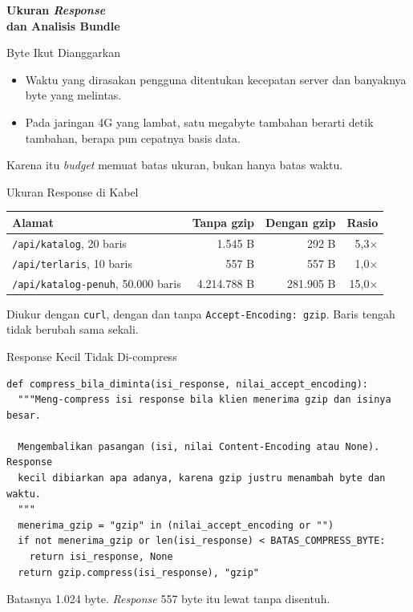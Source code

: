 \documentclass[aspectratio=169, table, 12pt]{beamer}
\begin{document}
\begin{frame}{\hfill}
  \centering
  \Huge{\textbf{Ukuran \textit{Response}\\dan Analisis Bundle}}
\end{frame}

\begin{frame}{{\Large Byte Ikut Dianggarkan}}
  \vspace{14pt}
  \begin{itemize}
    \item Waktu yang dirasakan pengguna ditentukan kecepatan server dan
          banyaknya byte yang melintas.
    \item Pada jaringan 4G yang lambat, satu megabyte tambahan berarti detik
          tambahan, berapa pun cepatnya basis data.
  \end{itemize}
  \vspace{10pt}
  {\footnotesize Karena itu \textit{budget} memuat batas ukuran, bukan hanya batas
  waktu.}
\end{frame}

\begin{frame}{{\Large Ukuran Response di Kabel}}
  \vspace{6pt}
  \centering
  {\footnotesize
  \begin{tabularx}{\textwidth}{Yrrr}
    \hline
    \textbf{Alamat} & \textbf{Tanpa gzip} & \textbf{Dengan gzip} & \textbf{Rasio} \\
    \hline
    \texttt{/api/katalog}, 20 baris & 1.545 B & 292 B & 5,3$\times$ \\
    \hline
    \texttt{/api/terlaris}, 10 baris & 557 B & 557 B & 1,0$\times$ \\
    \hline
    \texttt{/api/katalog-penuh}, 50.000 baris & 4.214.788 B & 281.905 B & 15,0$\times$ \\
    \hline
  \end{tabularx}}

  \vspace{8pt}
  {\footnotesize Diukur dengan \texttt{curl}, dengan dan tanpa
  \texttt{Accept-Encoding: gzip}. Baris tengah tidak berubah sama sekali.}
\end{frame}

\begin{frame}[fragile]{{\Large Response Kecil Tidak Di-compress}}
  \vspace{2pt}
\begin{lstlisting}[style=PythonStyle]
def compress_bila_diminta(isi_response, nilai_accept_encoding):
  """Meng-compress isi response bila klien menerima gzip dan isinya besar.

  Mengembalikan pasangan (isi, nilai Content-Encoding atau None). Response
  kecil dibiarkan apa adanya, karena gzip justru menambah byte dan waktu.
  """
  menerima_gzip = "gzip" in (nilai_accept_encoding or "")
  if not menerima_gzip or len(isi_response) < BATAS_COMPRESS_BYTE:
    return isi_response, None
  return gzip.compress(isi_response), "gzip"
\end{lstlisting}
  \vspace{2pt}
  {\footnotesize Batasnya 1.024 byte. \textit{Response} 557 byte itu lewat tanpa
  disentuh.}
\end{frame}
\end{document}

